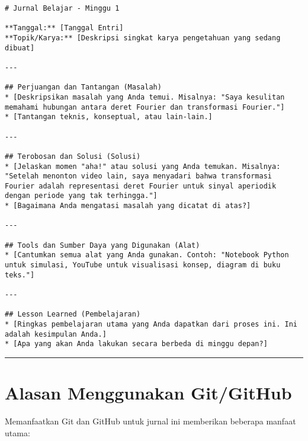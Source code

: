 \documentclass[
  letterpaper,
  DIV=11,
  numbers=noendperiod]{scrreprt}
\begin{document}
\begin{verbatim}
# Jurnal Belajar - Minggu 1

**Tanggal:** [Tanggal Entri]
**Topik/Karya:** [Deskripsi singkat karya pengetahuan yang sedang dibuat]

---

## Perjuangan dan Tantangan (Masalah)
* [Deskripsikan masalah yang Anda temui. Misalnya: "Saya kesulitan memahami hubungan antara deret Fourier dan transformasi Fourier."]
* [Tantangan teknis, konseptual, atau lain-lain.]

---

## Terobosan dan Solusi (Solusi)
* [Jelaskan momen "aha!" atau solusi yang Anda temukan. Misalnya: "Setelah menonton video lain, saya menyadari bahwa transformasi Fourier adalah representasi deret Fourier untuk sinyal aperiodik dengan periode yang tak terhingga."]
* [Bagaimana Anda mengatasi masalah yang dicatat di atas?]

---

## Tools dan Sumber Daya yang Digunakan (Alat)
* [Cantumkan semua alat yang Anda gunakan. Contoh: "Notebook Python untuk simulasi, YouTube untuk visualisasi konsep, diagram di buku teks."]

---

## Lesson Learned (Pembelajaran)
* [Ringkas pembelajaran utama yang Anda dapatkan dari proses ini. Ini adalah kesimpulan Anda.]
* [Apa yang akan Anda lakukan secara berbeda di minggu depan?]
\end{verbatim}

\begin{center}\rule{0.5\linewidth}{0.5pt}\end{center}

\section{Alasan Menggunakan
Git/GitHub}\label{alasan-menggunakan-gitgithub}

Memanfaatkan Git dan GitHub untuk jurnal ini memberikan beberapa manfaat
utama:
\end{document}
